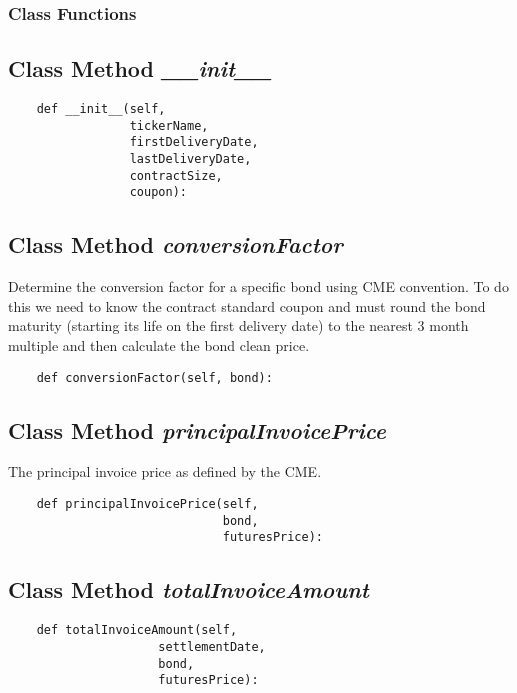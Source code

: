 \documentclass[twoside,11pt]{book}
\begin{document}
\subsubsection{Class Functions}

\subsection{Class Method {\it \_\_init\_\_}}


\begin{lstlisting}
    def __init__(self,
                 tickerName,
                 firstDeliveryDate, 
                 lastDeliveryDate, 
                 contractSize, 
                 coupon):
\end{lstlisting}

\subsection{Class Method {\it conversionFactor}}
Determine the conversion factor for a specific bond using CME convention. To do this we need to know the contract standard coupon and must round the bond maturity (starting its life on the first delivery date) to the nearest 3 month multiple and then calculate the bond clean price.  

\begin{lstlisting}
    def conversionFactor(self, bond):
\end{lstlisting}

\subsection{Class Method {\it principalInvoicePrice}}
The principal invoice price as defined by the CME.

\begin{lstlisting}
    def principalInvoicePrice(self,
                              bond,
                              futuresPrice):
\end{lstlisting}

\subsection{Class Method {\it totalInvoiceAmount}}


\begin{lstlisting}
    def totalInvoiceAmount(self,
                     settlementDate,
                     bond,
                     futuresPrice):
\end{lstlisting}
\end{document}

